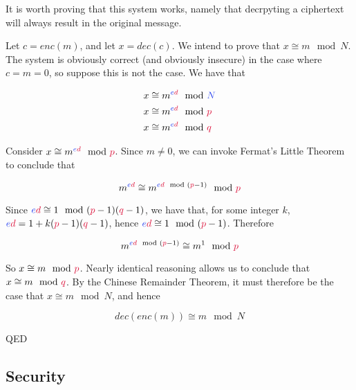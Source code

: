 	It is worth proving that this system works, namely that decrpyting a ciphertext will always result in the original message.

	\vspace{5mm}
	
	Let $c = enc(m)$, and let $x = dec(c)$. We intend to prove that $x \cong m \mod N$. The system is obviously correct (and obviously insecure) in the case where $c=m=0$, so suppose this is not the case. We have that
	
	\begin{align*}
	    x &\cong m^{\blue{e}\red{d}} \mod \blue{N}\\
	    x &\cong m^{\blue{e}\red{d}} \mod \red{p}\\
	    x &\cong m^{\blue{e}\red{d}} \mod \red{q}
	\end{align*}
	
	Consider $x \cong m^{\blue{e}\red{d}} \mod \red{p}$. Since $m \neq 0$, we can invoke Fermat's Little Theorem to conclude that
	
	$$
	    m^{\blue{e}\red{d}} \cong m^{\blue{e}\red{d} \mod (\red{p}-1)} \mod \red{p}
	$$
	
	Since $\blue{e}\red{d} \cong 1 \mod (\red{p}-1)(\red{q}-1)$, we have that, for some integer $k$, $\blue{e}\red{d} = 1 + k(\red{p}-1)(\red{q}-1)$, hence $\blue{e}\red{d} \cong 1 \mod (\red{p}-1)$. Therefore
	
	$$
	    m^{\blue{e}\red{d} \mod (\red{p}-1)}\cong m^1 \mod \red{p}
	$$
	
	So $x \cong m \mod \red{p}$. Nearly identical reasoning allows us to conclude that $x \cong m \mod \red{q}$. By the Chinese Remainder Theorem, it must therefore be the case that $x \cong m \mod N$, and hence
	
	$$
	    dec(enc(m)) \cong m \mod N 
	$$
	
	\begin{flushright}
	QED
	\end{flushright}
	\subsection{Security}

